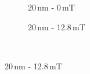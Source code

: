 \begin{figure}
          \begin{subfigure}{0.49\textwidth}
                  \flushleft
                  \caption{20\,nm - 0\,mT}\label{subfig:20nm_0mT}
          \end{subfigure}\hfill
        \begin{subfigure}{0.49\textwidth}
                \flushright
                \caption{20\,nm - 12.8\,mT}\label{subfig:20nm_128mT}
        \end{subfigure}\\

\end{figure}
